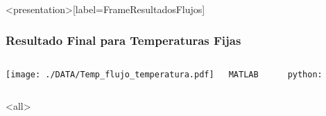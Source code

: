 \begin{frame}<presentation>[label=FrameResultadosFlujos]

  \frametitle{Resultado Final para Temperaturas Fijas}
  \begin{columns}
    
    \texttt{[image: ./DATA/Temp\_flujo\_temperatura.pdf]}

      \texttt{MATLAB}
    \begin{codeblock}
      
    \end{codeblock}
      
      \vspace{1cm}
      \texttt{python:}
    \begin{codeblock}
      
    \end{codeblock}
  \end{columns}


\end{frame}
\mode<all>
